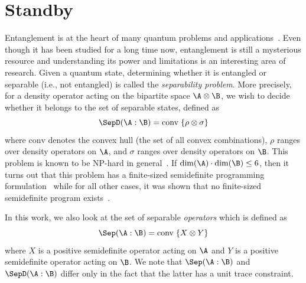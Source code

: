 \chapter{Standby} \label{ch:standby}

Entanglement is at the heart of many quantum problems and applications~\cite{horodecki2009quantum}.   
Even though it has been studied for a long time now, entanglement is still a mysterious resource and understanding its power and limitations is an interesting area of research.  
Given a quantum state, determining whether it is entangled or separable (i.e., not entangled) is called the \emph{separability problem}.  
More precisely, for a density operator acting on the bipartite space $\A \otimes \B$, we wish to decide whether it belongs to the set of separable states, defined as 
\begin{equation} 
\SepD(\A: \B) = \mathrm{conv} \; \{ \rho \otimes \sigma \} 
\label{eq:ch2_SEP-SepIntro}
\end{equation} 
where $\mathrm{conv}$ denotes the convex hull (the set of all convex combinations), $\rho$ ranges over density operators on $\A$, and $\sigma$ ranges over density operators on $\B$. 
This problem is known to be NP-hard in general~\cite{gurvits2004classical,gharibian2010strong}. 
If $\dim(\A) \cdot \dim(\B) \leq 6$, then it turns out that this problem has a finite-sized semidefinite programming formulation~\cite{horodecki1996necessary} while for all other cases, it was shown that no finite-sized semidefinite program exists~\cite{fawzi2021set}. 

In this work, we also look at the set of separable \emph{operators} which is  defined as  
\begin{equation} 
\Sep(\A: \B) = \mathrm{conv} \; \{ X \otimes Y \} 
\label{eq:ch2_SEP-Sep}
\end{equation} 
where $X$ is a positive semidefinite operator acting on $\A$ and $Y$ is a positive semidefinite operator acting on $\B$. 
We note that $\Sep(\A: \B)$ and $\SepD(\A: \B)$ differ only in the fact that the latter has a unit trace constraint. 

